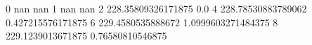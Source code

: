 0 nan nan
1 nan nan
2 228.35809326171875 0.0
4 228.78530883789062 0.427215576171875
6 229.4580535888672 1.0999603271484375
8 229.1239013671875 0.76580810546875

